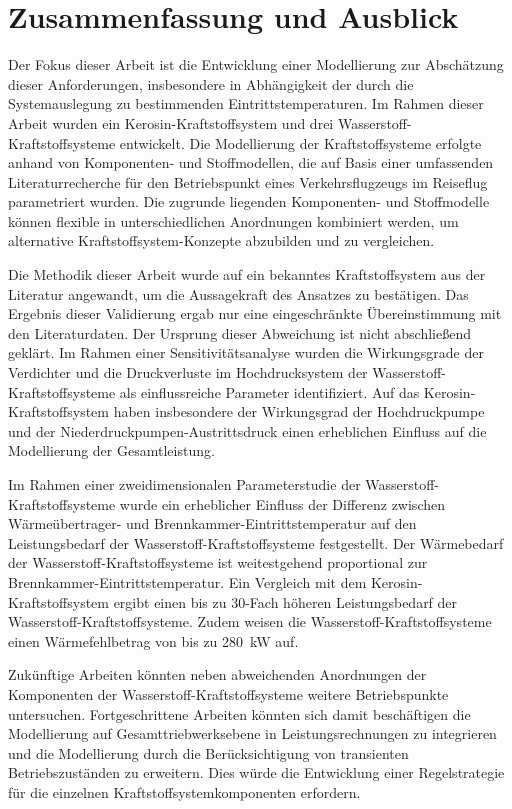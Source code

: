 \chapter{Zusammenfassung und Ausblick}
\label{chap:fazit}

Der Fokus dieser Arbeit ist die Entwicklung einer Modellierung zur Abschätzung dieser Anforderungen, insbesondere in Abhängigkeit der durch die Systemauslegung zu bestimmenden Eintrittstemperaturen. Im Rahmen dieser Arbeit wurden ein Kerosin-Kraftstoffsystem und drei Wasserstoff-Kraftstoffsysteme entwickelt. Die Modellierung der Kraftstoffsysteme erfolgte anhand von Komponenten- und Stoffmodellen, die auf Basis einer umfassenden Literaturrecherche für den Betriebspunkt eines Verkehrsflugzeugs im Reiseflug parametriert wurden. Die zugrunde liegenden Komponenten- und Stoffmodelle können flexible in unterschiedlichen Anordnungen kombiniert werden, um alternative Kraftstoffsystem-Konzepte abzubilden und zu vergleichen.

Die Methodik dieser Arbeit wurde auf ein bekanntes Kraftstoffsystem aus der Literatur angewandt, um die Aussagekraft des Ansatzes zu bestätigen. Das Ergebnis dieser Validierung ergab nur eine eingeschränkte Übereinstimmung mit den Literaturdaten. Der Ursprung dieser Abweichung ist nicht abschließend geklärt. Im Rahmen einer Sensitivitätsanalyse wurden die Wirkungsgrade der Verdichter und die Druckverluste im Hochdrucksystem der Wasserstoff-Kraftstoffsysteme als einflussreiche Parameter identifiziert. Auf das Kerosin-Kraftstoffsystem haben insbesondere der Wirkungsgrad der Hochdruckpumpe und der Niederdruckpumpen-Austrittsdruck einen erheblichen Einfluss auf die Modellierung der Gesamtleistung. 

Im Rahmen einer zweidimensionalen Parameterstudie der Wasserstoff-Kraftstoffsysteme wurde ein erheblicher Einfluss der Differenz zwischen Wärmeübertrager- und Brennkammer-Eintrittstemperatur auf den Leistungsbedarf der Wasserstoff-Kraftstoffsysteme festgestellt. Der Wärmebedarf der Wasserstoff-Kraftstoffsysteme ist weitestgehend proportional zur Brennkammer-Eintrittstemperatur. Ein Vergleich mit dem Kerosin-Kraftstoffsystem ergibt einen bis zu 30-Fach höheren Leistungsbedarf der Wasserstoff-Kraftstoffsysteme. Zudem weisen die Wasserstoff-Kraftstoffsysteme einen Wärmefehlbetrag von bis zu \SI{280}{\kilo\W} auf.

Zukünftige Arbeiten könnten neben abweichenden Anordnungen der Komponenten der Wasserstoff-Kraftstoffsysteme weitere Betriebspunkte untersuchen. Fortgeschrittene Arbeiten könnten sich damit beschäftigen die Modellierung auf Gesamttriebwerksebene in Leistungsrechnungen zu integrieren und die Modellierung durch die Berücksichtigung von transienten Betriebszuständen zu erweitern. Dies würde die Entwicklung einer Regelstrategie für die einzelnen Kraftstoffsystemkomponenten erfordern.